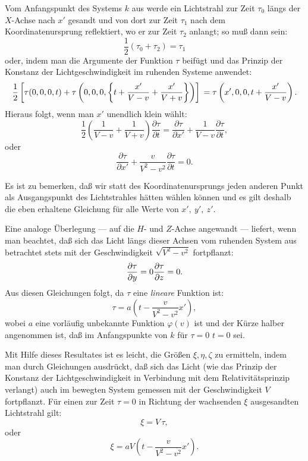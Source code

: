 \documentclass[17pt]{webarticle}       %
\begin{document}
Vom Anfangspunkt des Systems \( k \) aus werde ein Lichtstrahl zur Zeit \( \tau_0 \) längs der \( X \)-Achse nach \( x' \) gesandt und von dort zur Zeit \( \tau_1 \) nach dem Koordinatenursprung reflektiert, wo er zur Zeit \( \tau_2 \) anlangt; so muß dann sein:
\[
\frac{1}{2} (\tau_0 + \tau_2) = \tau_1
\]
oder, indem man die Argumente der Funktion \( \tau \) beifügt und das Prinzip der Konstanz der Lichtgeschwindigkeit im ruhenden Systeme anwendet:
\[
\frac{1}{2} \left[ \tau(0,0,0,t) + \tau \left(0,0,0, \left\{ t + \frac{x'}{V-v} + \frac{x'}{V+v} \right\} \right) \right]
\\
= \tau \left(x',0,0,t + \frac{x'}{V-v} \right) .
\]
Hieraus folgt, wenn man \( x' \) unendlich klein wählt:
\[
\frac{1}{2} \left( \frac{1}{V-v} + \frac{1}{V+v} \right) \frac{\partial \tau}{\partial t} = \frac{\partial \tau}{\partial x'} + \frac{1}{V-v} \frac{\partial \tau}{\partial t}, 
\]
oder
\[
\frac{\partial \tau}{\partial x'} + \frac{v}{V^2-v^2} \frac{\partial \tau}{\partial t} = 0.
\]

Es ist zu bemerken, daß wir statt des Koordinatenursprungs jeden anderen Punkt als Ausgangspunkt des Lichtstrahles hätten wählen können und es gilt deshalb die eben erhaltene Gleichung für alle Werte von \( x', \ y', \ z' \).

Eine analoge Überlegung — auf die \( H \)- und \( Z \)-Achse angewandt — liefert, wenn man beachtet, daß sich das Licht längs dieser Achsen vom ruhenden System aus betrachtet stets mit der Geschwindigkeit \( \sqrt{V^2 - v^2} \) fortpflanzt:
\[
\frac{\partial \tau}{\partial y} = 0
\\
\frac{\partial \tau}{\partial z} = 0.
\]
Aus diesen Gleichungen folgt, da \( \tau \) eine \emph{lineare} Funktion ist:
\[
\tau = a \left( t - \frac{v}{V^2 - v^2} x' \right) ,
\]
wobei \( a \) eine vorläufig unbekannte Funktion \( \varphi (v) \) ist und der Kürze halber angenommen ist, daß im Anfangspunkte von \( k \) für \( \tau = 0 \) \( t = 0 \) sei.

Mit Hilfe dieses Resultates ist es leicht, die Größen \( \xi, \eta, \zeta \) zu ermitteln, indem man durch Gleichungen ausdrückt, daß sich das Licht (wie das Prinzip der Konstanz der Lichtgeschwindigkeit in Verbindung mit dem Relativitätsprinzip verlangt) auch im bewegten System gemessen mit der Geschwindigkeit \( V \) fortpflanzt. Für einen zur Zeit \( \tau = 0 \) in Richtung der wachsenden \( \xi \) ausgesandten Lichtstrahl gilt:
\[
\xi = V \, \tau,
\]
oder
\[
\xi = a V \left( t - \frac{v}{V^2 - v^2} x' \right) .
\]
\end{document}
